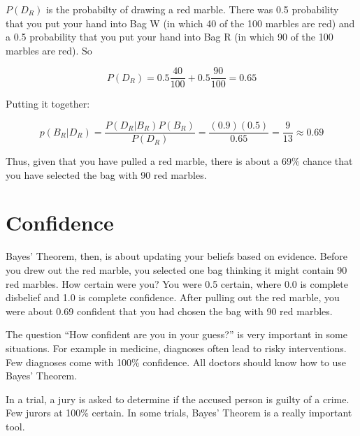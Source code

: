 $P(D_R)$ is the probabilty of drawing a red marble. There was 0.5
probability that you put your hand into Bag W (in which 40 of the 100
marbles are red) and a 0.5 probability that you put your hand into Bag
R (in which 90 of the 100 marbles are red).  So

$$P(D_R) = 0.5 \frac{40}{100} + 0.5 \frac{90}{100} = 0.65$$

Putting it together:

$$p(B_R | D_R) = \frac{ P(D_R | B_R) P(B_R) } {P(D_R)} = \frac{(0.9)(0.5)}{0.65} = \frac{9}{13} \approx 0.69$$

Thus, given that you have pulled a red marble, there is about a 69\% chance
that you have selected the bag with 90 red marbles.

\section{Confidence}

Bayes' Theorem, then, is about updating your beliefs based on
evidence.  Before you drew out the red marble, you selected one bag
thinking it might contain 90 red marbles. How certain were you? You
were 0.5 certain, where 0.0 is complete disbelief and 1.0 is complete
confidence.  After pulling out the red marble, you were about 0.69
confident that you had chosen the bag with 90 red marbles.

The question ``How confident are you in your guess?'' is very
important in some situations. For example in medicine, diagnoses often
lead to risky interventions. Few diagnoses come with 100\% confidence.
All doctors should know how to use Bayes' Theorem.

In a trial, a jury is asked to determine if the accused person is
guilty of a crime. Few jurors at 100\% certain. In some trials, Bayes'
Theorem is a really important tool.

